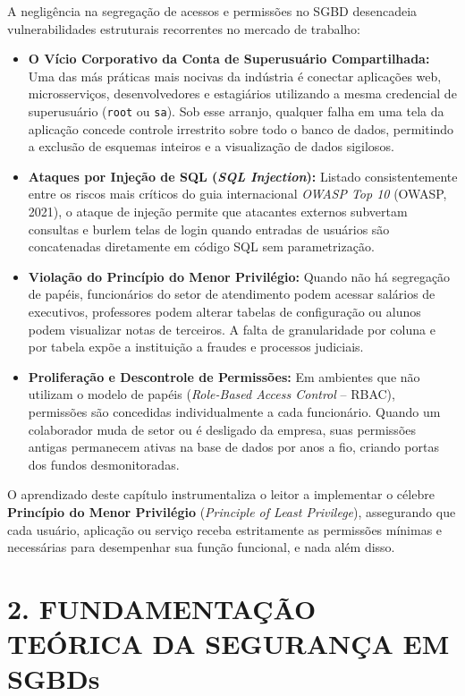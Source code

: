 A negligência na segregação de acessos e permissões no SGBD desencadeia vulnerabilidades estruturais recorrentes no mercado de trabalho:
\begin{itemize}
    \item \textbf{O Vício Corporativo da Conta de Superusuário Compartilhada:} Uma das más práticas mais nocivas da indústria é conectar aplicações web, microsserviços, desenvolvedores e estagiários utilizando a mesma credencial de superusuário (\texttt{root} ou \texttt{sa}). Sob esse arranjo, qualquer falha em uma tela da aplicação concede controle irrestrito sobre todo o banco de dados, permitindo a exclusão de esquemas inteiros e a visualização de dados sigilosos.
    \item \textbf{Ataques por Injeção de SQL (\textit{SQL Injection}):} Listado consistentemente entre os riscos mais críticos do guia internacional \textit{OWASP Top 10} (OWASP, 2021), o ataque de injeção permite que atacantes externos subvertam consultas e burlem telas de login quando entradas de usuários são concatenadas diretamente em código SQL sem parametrização.
    \item \textbf{Violação do Princípio do Menor Privilégio:} Quando não há segregação de papéis, funcionários do setor de atendimento podem acessar salários de executivos, professores podem alterar tabelas de configuração ou alunos podem visualizar notas de terceiros. A falta de granularidade por coluna e por tabela expõe a instituição a fraudes e processos judiciais.
    \item \textbf{Proliferação e Descontrole de Permissões:} Em ambientes que não utilizam o modelo de papéis (\textit{Role-Based Access Control} -- RBAC), permissões são concedidas individualmente a cada funcionário. Quando um colaborador muda de setor ou é desligado da empresa, suas permissões antigas permanecem ativas na base de dados por anos a fio, criando portas dos fundos desmonitoradas.
\end{itemize}

O aprendizado deste capítulo instrumentaliza o leitor a implementar o célebre \textbf{Princípio do Menor Privilégio} (\textit{Principle of Least Privilege}), assegurando que cada usuário, aplicação ou serviço receba estritamente as permissões mínimas e necessárias para desempenhar sua função funcional, e nada além disso.

\newpage

\section*{2. FUNDAMENTAÇÃO TEÓRICA DA SEGURANÇA EM SGBDs}

